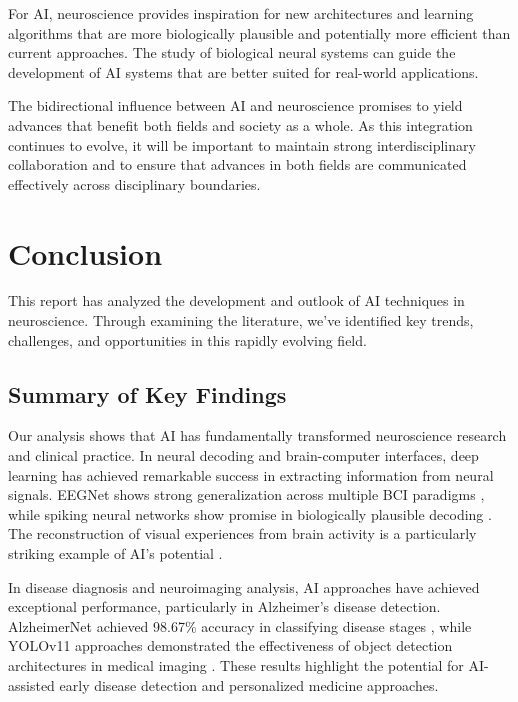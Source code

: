 \documentclass[conference]{IEEEtran}
\begin{document}
For AI, neuroscience provides inspiration for new architectures and learning algorithms that are more biologically plausible and potentially more efficient than current approaches. The study of biological neural systems can guide the development of AI systems that are better suited for real-world applications.

The bidirectional influence between AI and neuroscience promises to yield advances that benefit both fields and society as a whole. As this integration continues to evolve, it will be important to maintain strong interdisciplinary collaboration and to ensure that advances in both fields are communicated effectively across disciplinary boundaries.

\section{Conclusion}

This report has analyzed the development and outlook of AI techniques in neuroscience. Through examining the literature, we've identified key trends, challenges, and opportunities in this rapidly evolving field.

\subsection{Summary of Key Findings}

Our analysis shows that AI has fundamentally transformed neuroscience research and clinical practice. In neural decoding and brain-computer interfaces, deep learning has achieved remarkable success in extracting information from neural signals. EEGNet shows strong generalization across multiple BCI paradigms \citep{lawhernEEGNetCompactConvolutional2018}, while spiking neural networks show promise in biologically plausible decoding \citep{zenkeSuperSpikeSupervisedLearning2018}. The reconstruction of visual experiences from brain activity is a particularly striking example of AI's potential \citep{mathisDecodingBrainNeural2024}.

In disease diagnosis and neuroimaging analysis, AI approaches have achieved exceptional performance, particularly in Alzheimer's disease detection. AlzheimerNet achieved 98.67\% accuracy in classifying disease stages \citep{shamratAlzheimerNetEffectiveDeep2023}, while YOLOv11 approaches demonstrated the effectiveness of object detection architectures in medical imaging \citep{hechkelEarlyDetectionClassification2025}. These results highlight the potential for AI-assisted early disease detection and personalized medicine approaches.
\end{document}
